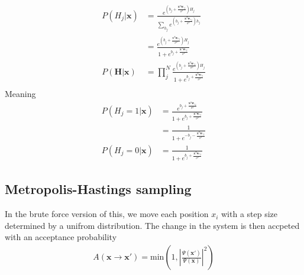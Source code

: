 \documentclass[norsk,a4paper,11pt]{article}
\newcommand{\Vx}{\mathbf{x}}
\begin{document}
\begin{align}
	P(H_j|\mathbf{x}) &= \frac{e^{(b_j+\frac{\mathbf{x}^T\mathbf{w}_{*j}}{\sigma^2})H_j}}{\sum_{h_j}e^{(b_j+\frac{\mathbf{x}^T\mathbf{w}_{*j}}{\sigma^2})h_j}} \\
	&= \frac{e^{(b_j+\frac{\mathbf{v}^T\mathbf{w}_{*j}}{\sigma^2})H_j}}{1+e^{b_j+\frac{\mathbf{x}^T\mathbf{w}_{*j}}{\sigma^2}}} \\
	P(\mathbf{H}|\mathbf{x}) &= \prod_j^N \frac{e^{(b_j+\frac{\mathbf{x}^T\mathbf{w}_{*j}}{\sigma^2})H_j}}{1+e^{b_j+\frac{\mathbf{x}^T\mathbf{w}_{*j}}{\sigma^2}}} \\
\end{align}
Meaning
\begin{align}
	P(H_j=1|\mathbf{x}) &= \frac{e^{b_j+\frac{\mathbf{x}^T\mathbf{w}_{*j}}{\sigma^2}}}{1+e^{b_j+\frac{\mathbf{x}^T\mathbf{w}_{*j}}{\sigma^2}}} \\
	&= \frac{1}{1+e^{-b_j-\frac{\mathbf{x}^T\mathbf{w}_{*j}}{\sigma^2}}} \\
	P(H_j=0|\mathbf{x}) &= \frac{1}{1+e^{b_j+\frac{\mathbf{x}^T\mathbf{w}_{*j}}{\sigma^2}}} 
\end{align}

\subsection{Metropolis-Hastings sampling}
In the brute force version of this, we move each position $x_i$ with a step size determined by a unifrom distribution. The change in the system is then accpeted with an acceptance probability
\begin{align}
	A (\Vx \rightarrow \Vx') = \text{min}(1, |\frac{\Psi(\Vx')}{\Psi(\Vx)}|^2)
\end{align}

%

\end{document}
